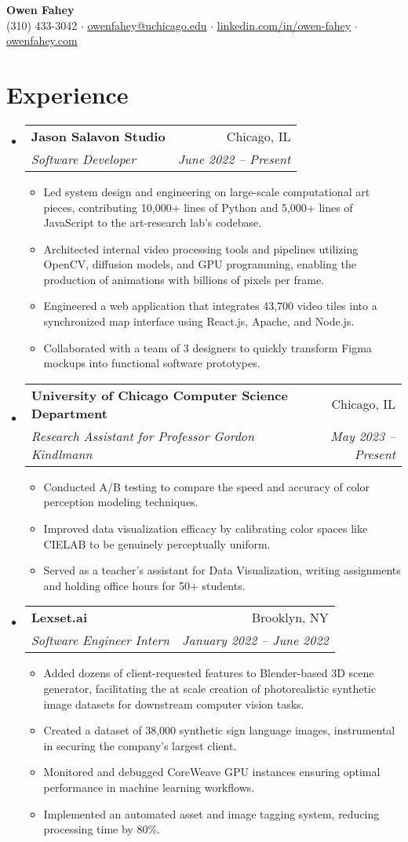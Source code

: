 \documentclass[letterpaper,11pt]{article}
\makeatletter
\newcommand{\resumeItem}[1]{
  \item\small{
    {#1 \vspace{-2pt}}
  }
}
\newcommand{\resumeSubheading}[4]{
  \vspace{-2pt}\item
    \begin{tabular*}{0.97\textwidth}[t]{l@{\extracolsep{\fill}}r}
      \textbf{#1} & #2 \\
      \textit{\small#3} & \textit{\small #4} \\
    \end{tabular*}\vspace{-7pt}
}
\newcommand{\resumeSubHeadingListStart}{\begin{itemize}[leftmargin=0.125in, label={}]}
\newcommand{\resumeSubHeadingListEnd}{\end{itemize}}
\newcommand{\resumeItemListStart}{\begin{itemize}[leftmargin=0.185in]
}
\newcommand{\resumeItemListEnd}{\end{itemize}\vspace{-5pt}}
\makeatother
\begin{document}
\begin{center}
  \textbf{\Huge 
Owen Fahey} \\
  \small (310) 433-3042 $\cdot$
  \href{mailto:owenfahey@uchicago.edu}{\underline{owenfahey@uchicago.edu}} $\cdot$
  \href{https://www.linkedin.com/in/owen-fahey}{\underline{linkedin.com/in/owen-fahey}} $\cdot$
  \href{https://owenfahey.com}{\underline{owenfahey.com}}
\end{center}

  
\section{Experience}
  \resumeSubHeadingListStart
    \resumeSubheading
      {Jason Salavon Studio}
      {Chicago, IL}
      {Software Developer}
      {June 2022 -- Present}
      \resumeItemListStart
        \resumeItem{Led system design and engineering on large-scale computational art pieces, contributing 10,000+ lines of Python and 5,000+ lines of JavaScript to the art-research lab's codebase.}
        \resumeItem{Architected internal video processing tools and pipelines utilizing OpenCV, diffusion models, and GPU programming, enabling the production of animations with billions of pixels per frame.}
        \resumeItem{Engineered a web application that integrates 43,700  video tiles into a synchronized map interface using React.js, Apache, and Node.js.}
        \resumeItem{Collaborated with a team of 3 designers to quickly transform Figma mockups into functional software prototypes.}
        
      \resumeItemListEnd
    \resumeSubheading
      {University of Chicago Computer Science Department}
      {Chicago, IL}
      {Research Assistant for Professor Gordon Kindlmann}
      {May 2023 -- Present}
      \resumeItemListStart
        \resumeItem{Conducted A/B testing to compare the speed and accuracy of color perception modeling techniques.}
        \resumeItem{Improved data visualization efficacy by calibrating color spaces like CIELAB to be genuinely perceptually uniform.}\resumeItem{Served as a teacher's assistant for Data Visualization, writing assignments and holding office hours for 50+ students.}
      \resumeItemListEnd
    \resumeSubheading
      {Lexset.ai}
      {Brooklyn, NY}
      {Software Engineer Intern}
      {January 2022 -- June 2022}
      \resumeItemListStart
        \resumeItem{Added dozens of client-requested features to Blender-based 3D scene generator, facilitating the at scale creation of photorealistic synthetic image datasets for downstream computer vision tasks.}
        \resumeItem{Created a dataset of 38,000 synthetic sign language images, instrumental in securing the company's largest client.}
        \resumeItem{Monitored and debugged CoreWeave GPU instances ensuring optimal performance in machine learning workflows. }
        \resumeItem{Implemented an automated asset and image tagging system, reducing processing time by 80\%.}
      \resumeItemListEnd
  \resumeSubHeadingListEnd
\end{document}
